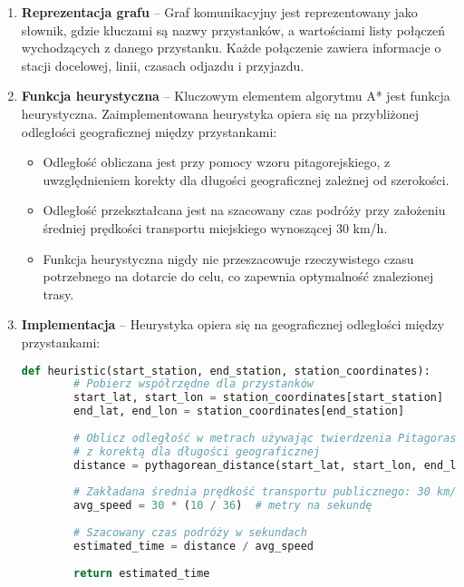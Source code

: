 \documentclass[12pt,a4paper]{article}
\begin{document}
\begin{enumerate}
    \item \textbf{Reprezentacja grafu} -- Graf komunikacyjny jest reprezentowany jako słownik, gdzie kluczami są nazwy przystanków, a wartościami listy połączeń wychodzących z danego przystanku. Każde połączenie zawiera informacje o stacji docelowej, linii, czasach odjazdu i przyjazdu.
    
    \item \textbf{Funkcja heurystyczna} -- Kluczowym elementem algorytmu A* jest funkcja heurystyczna. Zaimplementowana heurystyka opiera się na przybliżonej odległości geograficznej między przystankami:
    \begin{itemize}
        \item Odległość obliczana jest przy pomocy wzoru pitagorejskiego, z uwzględnieniem korekty dla długości geograficznej zależnej od szerokości.
        \item Odległość przekształcana jest na szacowany czas podróży przy założeniu średniej prędkości transportu miejskiego wynoszącej 30 km/h.
        \item Funkcja heurystyczna nigdy nie przeszacowuje rzeczywistego czasu potrzebnego na dotarcie do celu, co zapewnia optymalność znalezionej trasy.
    \end{itemize}
    
    \item \textbf{Implementacja} -- Heurystyka opiera się na geograficznej odległości między przystankami:
    \begin{lstlisting}[language=Python]
    def heuristic(start_station, end_station, station_coordinates):
        # Pobierz współrzędne dla przystanków
        start_lat, start_lon = station_coordinates[start_station]
        end_lat, end_lon = station_coordinates[end_station]
        
        # Oblicz odległość w metrach używając twierdzenia Pitagorasa
        # z korektą dla długości geograficznej
        distance = pythagorean_distance(start_lat, start_lon, end_lat, end_lon)
        
        # Zakładana średnia prędkość transportu publicznego: 30 km/h
        avg_speed = 30 * (10 / 36)  # metry na sekundę
        
        # Szacowany czas podróży w sekundach
        estimated_time = distance / avg_speed
        
        return estimated_time
    \end{lstlisting}
    

\end{enumerate}
\end{document}
